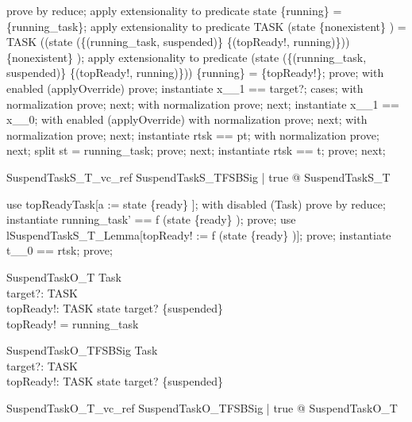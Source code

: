 \begin{zproof}
prove by reduce;
apply extensionality to predicate state \inv  \limg  \{running\} \rimg  = \{running\_task\};
apply extensionality to predicate TASK \setminus  (state \inv  \limg  \{nonexistent\} \rimg ) = TASK \setminus  ((state \oplus  (\{(running\_task, suspended)\} \cup  \{(topReady!, running)\})) \inv  \limg  \{nonexistent\} \rimg );
apply extensionality to predicate (state \oplus  (\{(running\_task, suspended)\} \cup  \{(topReady!, running)\})) \inv  \limg  \{running\} \rimg  = \{topReady!\};
prove;
with enabled (applyOverride) prove;
instantiate x\_\_1 == target?;
cases;
with normalization prove;
next;
with normalization prove;
next;
instantiate x\_\_1 == x\_\_0;
with enabled (applyOverride) with normalization prove;
next;
with normalization prove;
next;
instantiate rtsk == pt;
with normalization prove;
next;
split st = running\_task;
prove;
next;
instantiate rtsk == t;
prove;
next;
\end{zproof}

\begin{theorem}{SuspendTaskS\_T\_vc\_ref}
\forall  SuspendTaskS\_TFSBSig | true @ \pre  SuspendTaskS\_T
\end{theorem}

\begin{zproof}
use topReadyTask[a := state \inv  \limg  \{ready\} \rimg ];
with disabled (Task) prove by reduce;
instantiate running\_task' == f (state \inv  \limg  \{ready\} \rimg );
prove;
use lSuspendTaskS\_T\_Lemma[topReady! := f (state \inv  \limg  \{ready\} \rimg )];
prove;
instantiate t\_\_0 == rtsk;
prove;
\end{zproof}

\begin{schema}{SuspendTaskO\_T}
  \Xi Task\\
  target?: TASK\\
  topReady!: TASK
\where
  state target? \in  \{suspended\}\\
  topReady! = running\_task
\end{schema}

\begin{schema}{SuspendTaskO\_TFSBSig}
  Task\\
  target?: TASK\\
  topReady!: TASK
\where
  state target? \in  \{suspended\}
\end{schema}

\begin{theorem}{SuspendTaskO\_T\_vc\_ref}
\forall  SuspendTaskO\_TFSBSig | true @ \pre  SuspendTaskO\_T
\end{theorem}

